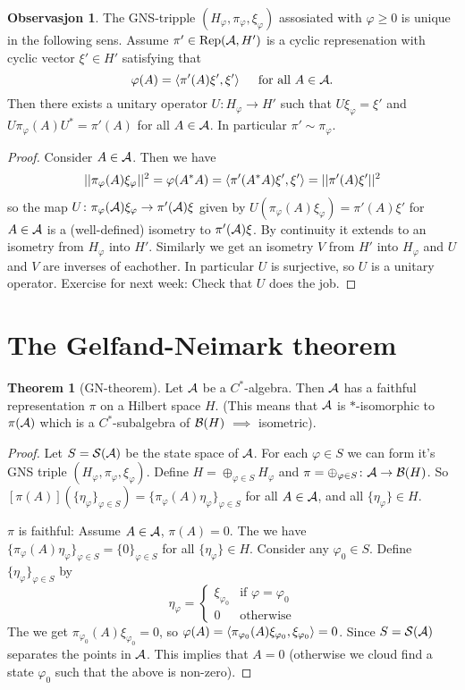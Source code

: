 \documentclass[10pt,english,a4paper]{article}
\theoremstyle{definition}
\newtheorem*{theorem}{Theorem}
\newtheorem*{observation}{Observasjon}
\def\pivp{\pi_{\vphi}}
\def\Hvp{H_{\vphi}}
\def\xivp{\xi_{\vphi}}
\def\etavp{\eta_{\vphi}}
\DeclareMathOperator{\Rep}{Rep}
\def\vphi{\varphi}
\begin{document}
\begin{observation}
    The GNS-tripple $(H_{\vphi}, \pi_{\vphi}, \xi_{\vphi})$ assosiated with 
$\vphi \geq 0$ is unique in the following sens. Assume $\pi' \in \Rep(\As,H')$ is 
a cyclic represenation with cyclic vector $\xi' \in H'$ satisfying that
\[ \vphi(A) = \ind{\pi'(A)\xi',\xi'} \quad \text{ for all } A \in \As.\]
Then there exists a unitary operator $U \colon H_{\vphi}\to H'$ such that  
$U\xi_{\vphi} = \xi'$ and $U\pi_{\vphi}(A)U^* = \pi'(A)$ for all $A \in \mathcal{A}$.
In particular $\pi' \sim \pi_{\vphi}$.
\end{observation}
\begin{proof}
Consider $A \in \mathcal{A}$. Then we have 
\begin{align*}
||\pi_{\vphi}(A)\xi_{\vphi}||^2 = \vphi(A^*A) = \ind{\pi'(A^*A)\xi',\xi'} 
= ||\pi'(A)\xi'||^2  
\end{align*}
so the map
$U\colon \pi_{\vphi}(\As)\xi_{\vphi} \to\pi'(\As)\xi$ given by 
$U(\pi_{\vphi}(A)\xi_{\vphi}) = \pi'(A)\xi'$ for $A \in \mathcal{A}$ is a (well-defined)
isometry to $\pi'(\mathcal{A})\xi$. By continuity it extends to an isometry from $H_{\vphi}$
into $H'$. Similarly we get an isometry $V$ from $H'$ into $H_{\vphi}$ and $U$
and $V$ are inverses of eachother. In particular $U$ is surjective, so $U$
is a unitary operator. Exercise for next week: Check that $U$ does the job. 

\end{proof}

\section*{The Gelfand-Neimark theorem}

\begin{theorem}[GN-theorem]
    Let $\mathcal{A}$ be a $C^*$-algebra. Then $\mathcal{A}$ has a faithful
representation $\pi$ on a Hilbert space $H$. 
(This means that $\mathcal{A}$ is $*$-isomorphic to $\pi(\mathcal{A})$ which is a 
$C^*$-subalgebra of $\mathcal{B}(H)$ $\implies$ isometric).
\end{theorem}
\begin{proof}
    Let $S = \mathcal{S}(\mathcal{A})$ be the state space of $\mathcal{A}$. For each $\vphi \in S$ 
we can form it's GNS triple $(\Hvp, \pivp, \xivp)$. 
Define $H = \oplus_{\vphi \in S} \Hvp$ and $\pi = \oplus_{\vphi \in S}\colon
\As\to \Bs(H)$. So $[\pi(A)](\{\etavp\}_{\vphi\in S}) = \{ \pivp(A)\etavp\}_{\vphi \in S}$
for all $A \in \mathcal{A}$, and all $\{\etavp\} \in H$.

$\pi$ is faithful: Assume $A\in \mathcal{A}$, $\pi(A) =0$. The we have 
$\{ \pivp(A)\etavp \}_{\vphi\in S} = \{0\}_{\vphi \in S}$ for all $\{\etavp\}
\in H$. Consider any $\vphi_0 \in S$. Define $\{\etavp\}_{\vphi \in S}$ by
\[ \etavp = \begin{cases} \xi_{\vphi_0} & \text{if } \vphi = \vphi_0 \\
0 & \text{otherwise} \end{cases} \]
The we get $\pi_{\vphi_0}(A) \xi_{\vphi_0} = 0$, so $\vphi(A) = \ind{\pi_{\vphi_0}(A)\xi_{\vphi_0}, \xi_{\vphi_0}}= 0$.
Since $S = \mathcal{S}(\mathcal{A})$ separates the points in $\mathcal{A}$. This implies that $A=0$ 
(otherwise we cloud find a state $\vphi_0$ such that the above is non-zero).
\end{proof}
\end{document}

